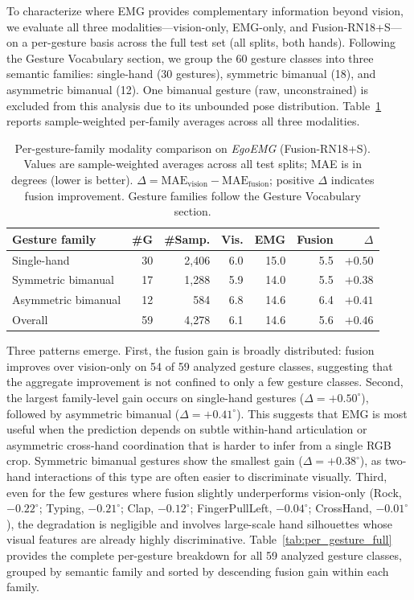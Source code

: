 \documentclass[letterpaper]{article} %
\newcommand{\dataset}{\textit{EgoEMG}}
\begin{document}
To characterize where EMG provides complementary information beyond vision,
we evaluate all three modalities---vision-only, EMG-only, and
Fusion-RN18+S---on a per-gesture basis across the full test set (all
splits, both hands). Following the Gesture Vocabulary section, we group the
60 gesture classes into
three semantic families: single-hand (30 gestures), symmetric bimanual (18),
and asymmetric bimanual (12). One bimanual gesture (raw, unconstrained) is excluded from this analysis due to its unbounded pose distribution.
Table~\ref{tab:per_gesture_family} reports
sample-weighted per-family averages across all three modalities.

\begin{table}[t]
\centering
\caption{Per-gesture-family modality comparison on \dataset{} (Fusion-RN18+S). Values are sample-weighted averages across all test splits; MAE is in degrees (lower is better). $\Delta = \text{MAE}_\text{vision} - \text{MAE}_\text{fusion}$; positive $\Delta$ indicates fusion improvement. Gesture families follow the Gesture Vocabulary section.}
\label{tab:per_gesture_family}
\footnotesize
\setlength{\tabcolsep}{2.5pt}
\renewcommand{\arraystretch}{1.08}
\begin{tabular}{lrrrrrr}
\toprule
Gesture family & \#G & \#Samp. & Vis. & EMG & Fusion & $\Delta$ \\
\midrule
Single-hand & 30 & 2,406 & 6.0 & 15.0 & 5.5 & $\mathbf{+0.50}$ \\
Symmetric bimanual & 17 & 1,288 & 5.9 & 14.0 & 5.5 & $+0.38$ \\
Asymmetric bimanual & 12 & 584 & 6.8 & 14.6 & 6.4 & $+0.41$ \\
\midrule
Overall & 59 & 4,278 & 6.1 & 14.6 & 5.6 & $+0.46$ \\
\bottomrule
\end{tabular}

\end{table}

Three patterns emerge. First, the fusion gain is broadly distributed: fusion
improves over vision-only on 54 of 59 analyzed gesture classes, suggesting that
the aggregate improvement is not confined to only a few gesture classes.
Second, the largest family-level gain occurs on single-hand
gestures ($\Delta = +0.50^\circ$), followed by asymmetric bimanual
($\Delta = +0.41^\circ$). This suggests that EMG is most useful
when the prediction depends on subtle within-hand articulation or asymmetric
cross-hand coordination that is harder to infer from a single RGB crop.
Symmetric bimanual gestures show the smallest gain ($\Delta = +0.38^\circ$),
as two-hand interactions of this type are often easier to discriminate
visually. Third, even for the few gestures where fusion slightly
underperforms vision-only (Rock, $-0.22^\circ$; Typing, $-0.21^\circ$;
Clap, $-0.12^\circ$; FingerPullLeft, $-0.04^\circ$; CrossHand, $-0.01^\circ$), the degradation is negligible and involves
large-scale hand silhouettes whose visual features are already highly
discriminative. Table~\ref{tab:per_gesture_full} provides the complete
per-gesture breakdown for all 59 analyzed gesture classes, grouped by semantic
family and sorted by descending fusion gain within each family.
\end{document}
